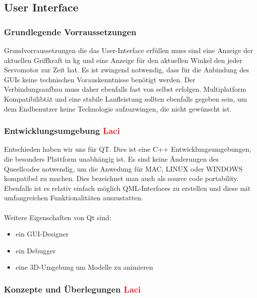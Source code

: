 \documentclass[titlepage,12pt,twoside]{article}
\begin{document}
\subsection{User Interface}

\subsubsection{Grundlegende Vorraussetzungen}
Grundvorraussetzungen die das User-Interface erfüllen muss sind eine Anzeige der aktuellen Griffkraft in kg und eine Anzeige für
den aktuellen Winkel den jeder Servomotor zur Zeit hat. Es ist zwingend notwendig, dass für die Anbindung des GUIs keine technischen
Vorauskenntnisse benötigt werden. Der Verbindungsaufbau muss daher ebenfalls fast von selbst erfolgen. Multiplatform Kompatibilibtät
und eine stabile Laufleistung sollten ebenfalls gegeben sein, um dem Endbenutzer keine Technologie aufzuzwingen, die nicht gewünscht ist.

\subsubsection{Entwicklungsumgebung \textcolor{red}{Laci}}

Entschieden haben wir uns für QT. Dies ist eine C++ Entwicklungsumgebungen, die besonders Plattform unabhängig ist. Es sind keine Änderungen
des Queellcodes notwendig, um die Anwedung für MAC, LINUX oder WINDOWS kompatibel zu machen. Dies bezeichnet man auch als source 
code portability. Ebenfalls ist es relativ einfach möglich QML-Interfaces zu erstellen und diese mit umfangreichen Funktionalitäten auszustatten. \\
\\ 
Weitere Eigenschaften von Qt sind:
\begin{itemize}
	\item ein GUI-Designer
	\item ein Debugger
	\item eine 3D-Umgebung um Modelle zu animieren
\end{itemize}

\subsubsection{Konzepte und Überlegungen \textcolor{red}{Laci}}
\end{document}
